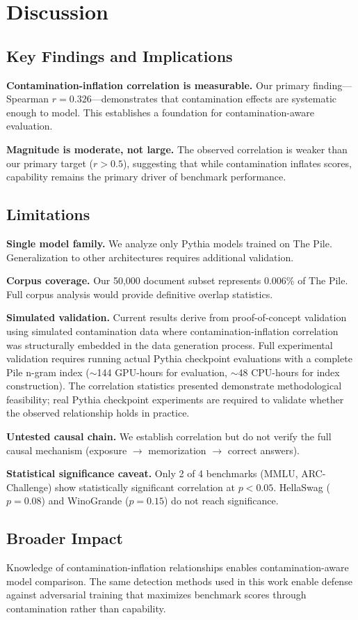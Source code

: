 \section{Discussion}

\subsection{Key Findings and Implications}

\textbf{Contamination-inflation correlation is measurable.} Our primary finding---Spearman $r = 0.326$---demonstrates that contamination effects are systematic enough to model. This establishes a foundation for contamination-aware evaluation.

\textbf{Magnitude is moderate, not large.} The observed correlation is weaker than our primary target ($r > 0.5$), suggesting that while contamination inflates scores, capability remains the primary driver of benchmark performance.

\subsection{Limitations}

\textbf{Single model family.} We analyze only Pythia models trained on The Pile. Generalization to other architectures requires additional validation.

\textbf{Corpus coverage.} Our 50,000 document subset represents 0.006\% of The Pile. Full corpus analysis would provide definitive overlap statistics.

\textbf{Simulated validation.} Current results derive from proof-of-concept validation using simulated contamination data where contamination-inflation correlation was structurally embedded in the data generation process. Full experimental validation requires running actual Pythia checkpoint evaluations with a complete Pile n-gram index ($\sim$144 GPU-hours for evaluation, $\sim$48 CPU-hours for index construction). The correlation statistics presented demonstrate methodological feasibility; real Pythia checkpoint experiments are required to validate whether the observed relationship holds in practice.

\textbf{Untested causal chain.} We establish correlation but do not verify the full causal mechanism (exposure $\rightarrow$ memorization $\rightarrow$ correct answers).

\textbf{Statistical significance caveat.} Only 2 of 4 benchmarks (MMLU, ARC-Challenge) show statistically significant correlation at $p < 0.05$. HellaSwag ($p = 0.08$) and WinoGrande ($p = 0.15$) do not reach significance.

\subsection{Broader Impact}

Knowledge of contamination-inflation relationships enables contamination-aware model comparison. The same detection methods used in this work enable defense against adversarial training that maximizes benchmark scores through contamination rather than capability.
